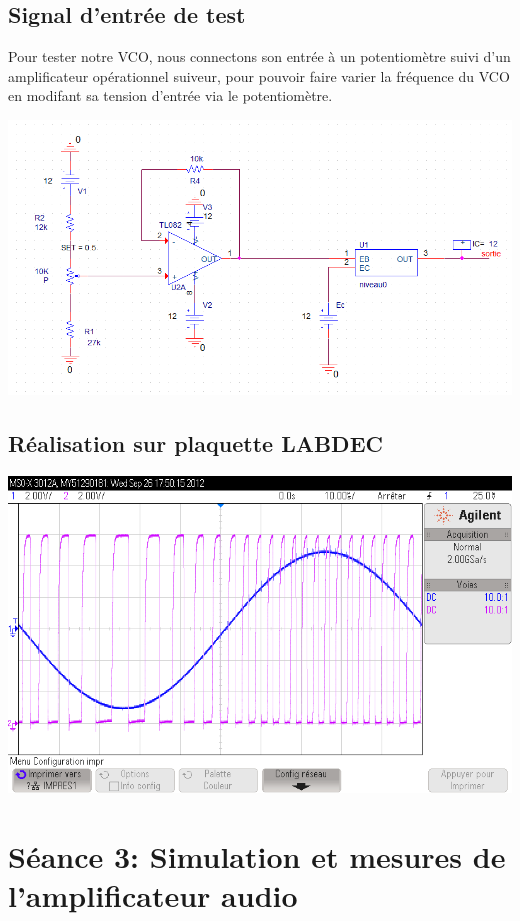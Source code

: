 \subsection{Signal d’entrée de test}

Pour tester notre VCO, nous connectons son entrée à un potentiomètre suivi d’un amplificateur opérationnel suiveur, pour pouvoir faire varier la fréquence du VCO en modifant sa tension d’entrée via le potentiomètre.

\includegraphics[width=\linewidth]{../img/schematic_test_vco.png}

\subsection{Réalisation sur plaquette LABDEC}

\includegraphics[width=\linewidth]{../img/moulation_frec_labde.png}

\section{Séance 3: Simulation et mesures de l’amplificateur audio}

